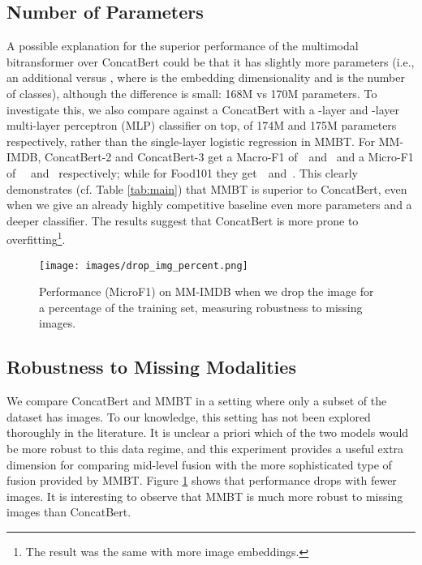 \documentclass[11pt,a4paper]{article}
\begin{document}
\subsection{Number of Parameters} A possible explanation for the superior performance of the multimodal bitransformer over ConcatBert could be that it has slightly more parameters (i.e., an additional  versus , where  is the embedding dimensionality and  is the number of classes), although the difference is small: 168M vs 170M parameters. To investigate this, we also compare against a ConcatBert with a -layer and -layer multi-layer perceptron (MLP) classifier on top, of 174M and 175M parameters respectively, rather than the single-layer logistic regression in MMBT. For MM-IMDB, ConcatBert-2 and ConcatBert-3 get a Macro-F1 of~~and~ and a Micro-F1 of ~~and ~respectively; while for Food101 they get~~and~. This clearly demonstrates (cf. Table \ref{tab:main}) that MMBT is superior to ConcatBert, even when we give an already highly competitive baseline even more parameters and a deeper classifier. The results suggest that ConcatBert is more prone to overfitting\footnote{The result was the same with more image embeddings.}.







\begin{figure}[t]
    \centering
    \texttt{[image: images/drop\_img\_percent.png]}
    \caption{Performance (MicroF1) on MM-IMDB when we drop the image for a percentage of the training set, measuring robustness to missing images.}
    \label{fig:dropimg}
\end{figure}

\subsection{Robustness to Missing Modalities} 

We compare ConcatBert and MMBT in a setting where only a subset of the dataset has images. To our knowledge, this setting has not been explored thoroughly in the literature. It is unclear a priori which of the two models would be more robust to this data regime, and this experiment provides a useful extra dimension for comparing mid-level fusion with the more sophisticated type of fusion provided by MMBT. Figure \ref{fig:dropimg} shows that performance drops with fewer images. 
It is interesting to observe that MMBT is much more robust to missing images than ConcatBert.
\end{document}
